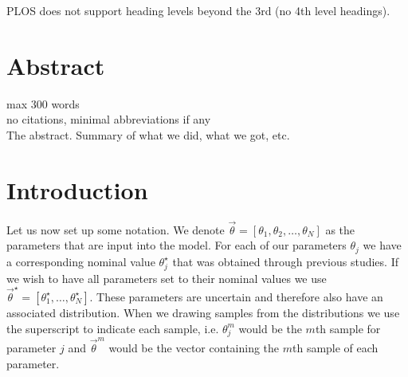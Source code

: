 \documentclass[10pt,letterpaper]{article}
\newcommand{\lorem}{{\bf LOREM}}
\newcommand{\ipsum}{{\bf IPSUM}}
\begin{document}
	PLOS does not support heading levels beyond the 3rd (no 4th level headings).
	
	\section*{Abstract}
	\textinterrobang max 300 words\\
	\textinterrobang no citations, minimal abbreviations if any\\
	
	The abstract. Summary of what we did, what we got, etc.
	
	

	
	\linenumbers
	
	
	\section*{Introduction}
	
	
	
	
	
	Let us now set up some notation. We denote $\vec{\theta}=[\theta_1, \theta_2,\ldots,\theta_N]$ as the parameters that are input into the model. 
	For each of our parameters $\theta_j$ we have a corresponding nominal value $\theta_j^\star$ that was obtained through previous studies. If we wish to have all parameters set to their nominal values we use $\vec{\theta}^\star=[\theta_1^\star,\ldots,\theta_N^\star]$. These parameters are uncertain and therefore also have an associated distribution. When we drawing samples from the distributions we use the superscript to indicate each sample, i.e. $\theta_j^m$ would be the $m$th sample for parameter $j$ and $\vec{\theta}^m$ would be the vector containing the $m$th sample of each parameter.
	
\end{document}
